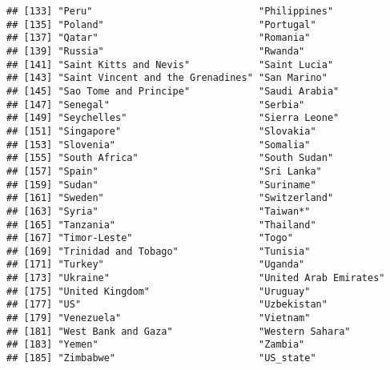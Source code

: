 \documentclass[]{article}
\newenvironment{Shaded}{\begin{snugshade}}{\end{snugshade}}
\newcommand{\KeywordTok}[1]{\textcolor[rgb]{0.13,0.29,0.53}{\textbf{{#1}}}}
\newcommand{\DataTypeTok}[1]{\textcolor[rgb]{0.13,0.29,0.53}{{#1}}}
\newcommand{\DecValTok}[1]{\textcolor[rgb]{0.00,0.00,0.81}{{#1}}}
\newcommand{\StringTok}[1]{\textcolor[rgb]{0.31,0.60,0.02}{{#1}}}
\newcommand{\CommentTok}[1]{\textcolor[rgb]{0.56,0.35,0.01}{\textit{{#1}}}}
\newcommand{\NormalTok}[1]{{#1}}
\begin{document}
\begin{verbatim}
## [133] "Peru"                             "Philippines"                     
## [135] "Poland"                           "Portugal"                        
## [137] "Qatar"                            "Romania"                         
## [139] "Russia"                           "Rwanda"                          
## [141] "Saint Kitts and Nevis"            "Saint Lucia"                     
## [143] "Saint Vincent and the Grenadines" "San Marino"                      
## [145] "Sao Tome and Principe"            "Saudi Arabia"                    
## [147] "Senegal"                          "Serbia"                          
## [149] "Seychelles"                       "Sierra Leone"                    
## [151] "Singapore"                        "Slovakia"                        
## [153] "Slovenia"                         "Somalia"                         
## [155] "South Africa"                     "South Sudan"                     
## [157] "Spain"                            "Sri Lanka"                       
## [159] "Sudan"                            "Suriname"                        
## [161] "Sweden"                           "Switzerland"                     
## [163] "Syria"                            "Taiwan*"                         
## [165] "Tanzania"                         "Thailand"                        
## [167] "Timor-Leste"                      "Togo"                            
## [169] "Trinidad and Tobago"              "Tunisia"                         
## [171] "Turkey"                           "Uganda"                          
## [173] "Ukraine"                          "United Arab Emirates"            
## [175] "United Kingdom"                   "Uruguay"                         
## [177] "US"                               "Uzbekistan"                      
## [179] "Venezuela"                        "Vietnam"                         
## [181] "West Bank and Gaza"               "Western Sahara"                  
## [183] "Yemen"                            "Zambia"                          
## [185] "Zimbabwe"                         "US_state"
\end{verbatim}

\begin{Shaded}
\end{Shaded}
\end{document}

